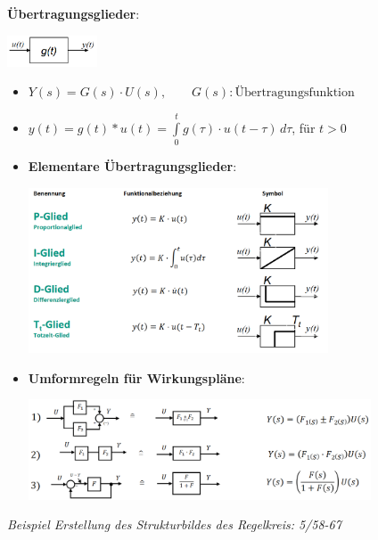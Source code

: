 \textbf{Übertragungsglieder}:
\begin{center}
	\includegraphics[width=0.2\textwidth]{images/uglied.png}
\end{center}
\begin{itemize}
	\item $Y(s)=G(s)\cdot U(s),\qquad G(s)\colon\text{Übertragungsfunktion}$ 
	\item $y(t)=g(t)*u(t)=\int\limits_0^{t} g(\tau)\cdot u(t-\tau)\, d\tau$, für $t>0$
	\item \textbf{Elementare Übertragungsglieder}: 
	\begin{center}
		\includegraphics[width=0.7\textwidth]{images/pidt.png}
	\end{center}
 	\item \textbf{Umformregeln für Wirkungspläne}:
 	\begin{center}
 		\includegraphics[width=0.8\textwidth]{images/uglied-rules.png}
 	\end{center}
\end{itemize}

\textit{Beispiel Erstellung des Strukturbildes des Regelkreis: 5/58-67}


